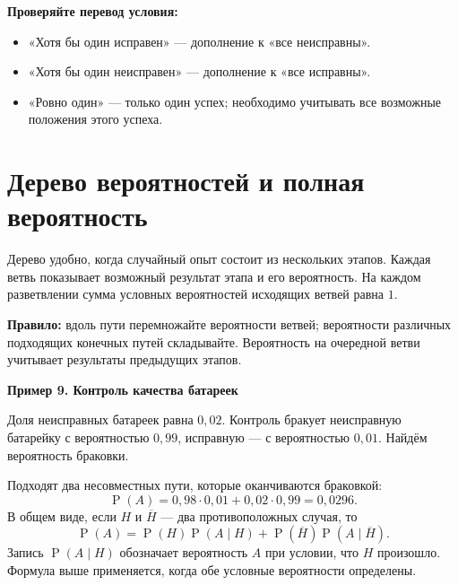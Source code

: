 \documentclass[a4paper,12pt]{article}
\newcommand{\example}[1]{\par\medskip\textcolor{darkaccent}{\textbf{#1}}\par}
\newcommand{\checkitem}{\item[$\square$]}
\newcommand{\prob}{\mathop{\mathrm{P}}}
\begin{document}
\textcolor{darkaccent}{\textbf{Проверяйте перевод условия:}}
\begin{itemize}
\checkitem «Хотя бы один исправен» — дополнение к «все неисправны».
\checkitem «Хотя бы один неисправен» — дополнение к «все исправны».
\checkitem «Ровно один» — только один успех; необходимо учитывать все возможные положения этого успеха.
\end{itemize}

\clearpage
\section{Дерево вероятностей и полная вероятность}
Дерево удобно, когда случайный опыт состоит из нескольких этапов. Каждая ветвь показывает возможный результат этапа и его вероятность. На каждом разветвлении сумма условных вероятностей исходящих ветвей равна $1$.

\textcolor{darkaccent}{\textbf{Правило:}} вдоль пути перемножайте вероятности ветвей; вероятности различных подходящих конечных путей складывайте. Вероятность на очередной ветви учитывает результаты предыдущих этапов.

\example{Пример 9. Контроль качества батареек}
Доля неисправных батареек равна $0,02$. Контроль бракует неисправную батарейку с вероятностью $0,99$, исправную — с вероятностью $0,01$. Найдём вероятность браковки.
\begin{center}
\end{center}
Подходят два несовместных пути, которые оканчиваются браковкой:
\[ \prob(A)=0,98\cdot0,01+0,02\cdot0,99=0,0296. \]
В общем виде, если $H$ и $\overline H$ — два противоположных случая, то
\[ \prob(A)=\prob(H)\prob(A\mid H)+\prob(\overline H)\prob(A\mid\overline H). \]
Запись $\prob(A\mid H)$ обозначает вероятность $A$ при условии, что $H$ произошло. Формула выше применяется, когда обе условные вероятности определены.
\end{document}
